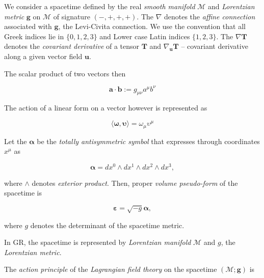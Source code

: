 {    We consider a spacetime defined by the real \textit{smooth manifold} $\mathcal{M}$ and \textit{Lorentzian metric} $\boldsymbol{g}$ on $\mathcal{M}$ of signature $(-,+,+,+)$. 
    The $\nabla$ denotes the \textit{affine connection} associated with $\boldsymbol{g}$, the Levi-Civita connection.
    We use the convention that all Greek indices lie in $\{0, 1, 2, 3\}$ and Lower case Latin indices $\{1, 2, 3\}$.
    The $\nabla\boldsymbol{T}$ denotes the \textit{covariant derivative} of a tensor $\boldsymbol{T}$ and $\nabla_{\boldsymbol{u}}\boldsymbol{T}$ -- covariant derivative along a given vector field $\boldsymbol{u}$.
    
    The scalar product of two vectors then 
    
    \begin{equation}
    \boldsymbol{a}\cdot\boldsymbol{b}:=g_{\mu\nu}a^{\mu}b^{\nu}
    \end{equation}
    
    The action of a linear form on a vector however is represented as 
    
    \begin{equation}
    \langle\boldsymbol{\omega},\boldsymbol{\upsilon}\rangle=\omega_{\mu}\upsilon^{\mu}
    \end{equation}
    
    Let the $\boldsymbol{\alpha}$ be the \textit{totally antisymmetric symbol} that expresses through coordinates $x^{\mu}$ as
    
    \begin{equation}
    \boldsymbol{\alpha} = dx^0 \wedge dx^1 \wedge dx^2 \wedge dx^3,
    \end{equation}
    
    where $\wedge$ denotes \textit{exterior product}. 
    Then, proper \textit{volume pseudo-form} of the spacetime is
    
    \begin{equation}
    \boldsymbol{\varepsilon} = \sqrt{-g}\boldsymbol{\alpha},
    \end{equation}
    
    where $g$ denotes the determinant of the spacetime metric.
    
    In GR, the spacetime is represented by \textit{Lorentzian manifold} $\mathcal{M}$ and $g$, the \textit{Lorentzian metric}.
    
    The \textit{action principle} of the \textit{Lagrangian field theory} on the spacetime $(\mathcal{M}; \boldsymbol{g})$ is
    
}
